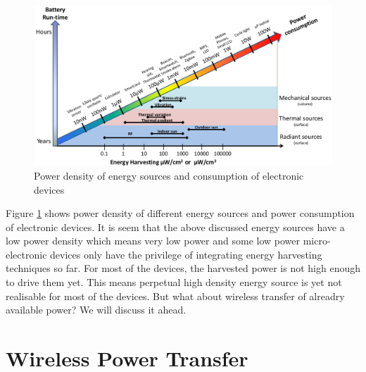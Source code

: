 \documentclass[UKenglish]{ifimaster}  %
\begin{document}
\begin{figure}[H] %
   \centering
   \includegraphics[width=\textwidth]{img/power_density_2.png}
   \caption{Power density of energy sources and consumption of electronic devices \cite{power_density}}
   \label{fig:power_density}
\end{figure}

Figure \ref{fig:power_density} shows power density of different energy sources and power consumption of electronic 
devices. It is seem  that the above discussed energy sources have a low power density which means very low power 
and some low power micro-electronic devices only have the privilege of integrating energy harvesting techniques 
so far. For most of the devices, the harvested power is not high enough to drive them yet. This means perpetual 
high density energy source is yet not realisable for most of the devices. But what about wireless transfer of 
alreadry available power? We will discuss it ahead. 


\section{Wireless Power Transfer}
\end{document}
